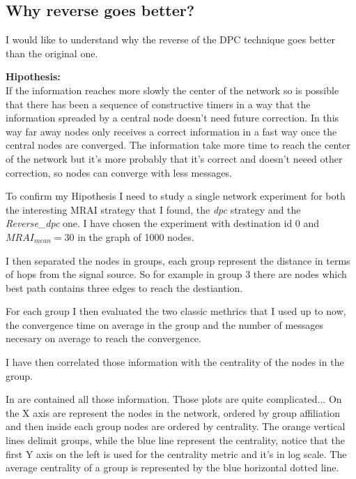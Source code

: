 \documentclass[10pt,conference,letterpaper]{IEEEtran}
\begin{document}
\subsection{Why reverse goes better?}
\label{subsec:reverseVSdpc}

I would like to understand why the reverse of the \ac{DPC} technique goes better
than the original one.

\textbf{Hipothesis:}\\
If the information reaches more slowly the center of the network so is possible
that there has been a sequence of constructive timers in a way that the information
spreaded by a central node doesn't need future correction.
In this way far away nodes only receives a correct information in a fast way once
the central nodes are converged.
The information take more time to reach the center of the network but it's more
probably that it's correct and doesn't neeed other correction, so nodes can converge
with less messages.

To confirm my Hipothesis I need to study a single network experiment for both the
interesting \ac{MRAI} strategy that I found, the \textit{dpc} strategy and the
\textit{Reverse\_dpc} one.
I have chosen the experiment with destination id \num{0} and $MRAI_{mean} = 30$
in the graph of \num{1000} nodes.

I then separated the nodes in groups, each group represent the distance in terms
of hops from the signal source.
So for example in group $3$ there are nodes which best path contains three edges
to reach the destiantion.

For each group I then evaluated the two classic methrics that I used up to now,
the convergence time on average in the group and the number of messages necesary
on average to reach the convergence.

I have then correlated those information with the centrality of the nodes in the group.

In  are contained
all those information.
Those plots are quite complicated...
On the X axis are represent the nodes in the network, ordered by group affiliation
and then inside each group nodes are ordered by centrality.
The orange vertical lines delimit groups, while the blue line represent 
the centrality, notice that the first Y axis on the left is used for 
the centrality metric and it's in log scale.
The average centrality of a group is represented by the blue horizontal dotted line.
\end{document}
